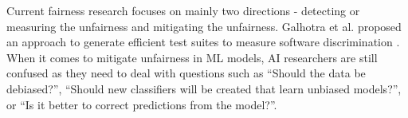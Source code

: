 Current fairness research focuses on mainly two directions - detecting or measuring  the unfairness and mitigating the unfairness. Galhotra et al. proposed an approach to generate efficient test suites to measure software discrimination \cite{Galhotra_2017}. When it comes to mitigate unfairness in ML models, AI researchers are still confused as they need to deal with questions such as ``Should the data be debiased?'', ``Should new classifiers will be created that learn unbiased models?'', or ``Is it better to correct predictions from the model?''. 

    
   
